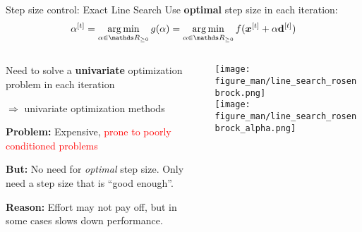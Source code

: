 \documentclass[11pt,compress,t,notes=noshow, xcolor=table]{beamer}
\begin{document}
	\begin{vbframe}{Step size control: Exact Line Search}
		Use \textbf{optimal} step size in each iteration:
		\vspace*{-0.1cm}
		$$ \alpha^{[t]} = \argmin_{\alpha \in \R_{\ge 0}} g(\alpha) = \argmin_{\alpha \in \R_{\ge 0}} f(\bm{x}^{[t]} + \alpha \mathbf{d}^{[t]})$$
		\begin{columns}
			\begin{column}{0.59\textwidth}
				Need to solve a \textbf{univariate} optimization problem in each iteration

                $\Rightarrow$ univariate optimization methods

                \medskip
                
                \textbf{Problem:} Expensive, \textcolor{red}{prone to poorly conditioned problems}

                \medskip

                \textbf{But:} No need for \textit{optimal} step size.
                Only need a step size that is \enquote{good enough}.
                
                \textbf{Reason:} Effort may not pay off, but in some cases slows down performance.
			\end{column}
			\begin{column}{0.4\textwidth}
				\vspace*{-1cm}
				\begin{center}
					\texttt{[image: figure\_man/line\_search\_rosenbrock.png]} \\
					\texttt{[image: figure\_man/line\_search\_rosenbrock\_alpha.png]}
				\end{center}
			\end{column}
		\end{columns}
	\end{vbframe}
	
\end{document}
